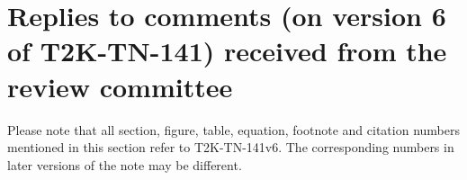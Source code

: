 \clearpage

\section{Replies to comments (on version 6 of T2K-TN-141) received from the review committee}

{\color{red}
Please note that all section, figure, table, equation, footnote and citation 
numbers mentioned in this section refer to T2K-TN-141v6. 
The corresponding numbers in later versions of the note may be different.
}

